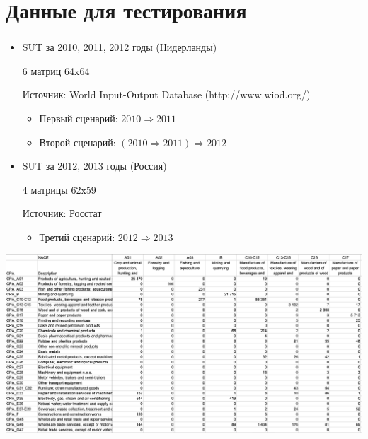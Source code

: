 \documentclass{beamer}
\begin{document}
\section{Данные для тестирования}
\begin{frame}
	\frametitle{\insertsection}
	
	\begin{center}
	
	\end{center}
	\begin{itemize}
	    
	    \item SUT за 2010, 2011, 2012 годы (Нидерланды) 
	    
	    6 матриц 64x64
	    
	    Источник: World Input-Output Database (http://www.wiod.org/)
	    
	    \begin{itemize}
	        \item Первый сценарий: $2010 \Rightarrow 2011$
	        \item Второй сценарий: $(2010 \Rightarrow 2011) \Rightarrow 2012$
	    \end{itemize}
	    
	    \item SUT за 2012, 2013 годы (Россия)
	    
	    4 матрицы 62x59
	    
	    Источник: Росстат
	    
	    \begin{itemize}
	        \item Третий сценарий: $2012 \Rightarrow 2013$
	    \end{itemize}
	\end{itemize}
    
\end{frame}

\begin{frame}

    \includegraphics[width=\textwidth]{2019-12-12_05-25-06.png}
    
\end{frame}
\end{document}
